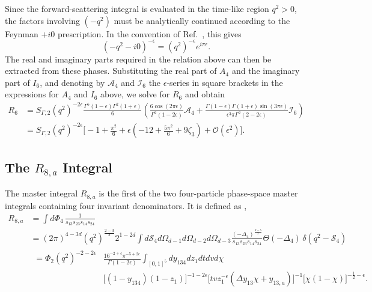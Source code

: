 Since the forward-scattering integral is evaluated in the time-like region $q^2>0$, the factors
involving $(-q^2)$ must be analytically continued according to the Feynman $+i0$ prescription.
In the convention of Ref.~\cite{GehrmannDeRidder0311276}, this gives
\begin{equation*}
    \left(-q^2-i0\right)^{-\epsilon}=\left(q^2\right)^{-\epsilon}e^{i\pi\epsilon}.
\end{equation*}
The real and imaginary parts required in the relation above can then be extracted from these
phases. Substituting the real part of $A_4$ and the imaginary part of $I_6$, and denoting by
$\mathcal A_4$ and $\mathcal I_6$ the $\epsilon$-series in square brackets in the expressions
for $A_4$ and $I_6$ above, we solve for $R_6$ and obtain
\begin{equation}
    \begin{split}
        R_6 &= S_{\Gamma,2}\!\left(q^2\right)^{-2\epsilon}\frac{\Gamma^6(1-\epsilon)\Gamma^2(1+\epsilon)}{6}\left(\frac{6\cos(2\pi\epsilon)}{\Gamma^2(1-2\epsilon)}\mathcal A_4+\frac{\Gamma(1-\epsilon)\Gamma(1+\epsilon)\sin(3\pi\epsilon)}{\epsilon^3\pi\Gamma^2(2-2\epsilon)}\mathcal I_6\right)\\
            &= S_{\Gamma,2}\!\left(q^2\right)^{-2\epsilon}\Bigg[-1+\frac{\pi^2}6+\epsilon\!\left(-12+\frac{5\pi^2}6+9\zeta_3\right)+\mathcal O\!\left(\epsilon^2\right)\Bigg].
    \end{split}
\end{equation}

\subsection{The $R_{8,a}$ Integral}\label{subsec:R8aMI}

The master integral $R_{8,a}$ is the first of the two four-particle phase-space master integrals
containing four invariant denominators. It is defined as \cite{GehrmannDeRidder0311276},
\begin{equation}
    \begin{split}
        R_{8,a} &= \int d\Phi_4\,\frac1{s_{13}s_{23}s_{14}s_{24}}\\
                &= (2\pi)^{4-3d}\!\left(q^2\right)^{\frac{2-d}{2}}2^{1-2d}\int d\mathcal S_4d\Omega_{d-1}d\Omega_{d-2}d\Omega_{d-3}\frac{(-\Delta_4)^{\frac{d-5}{2}}}{s_{13}s_{23}s_{14}s_{24}}\Theta(-\Delta_4)\,\delta\!\left(q^2-\mathcal S_4\right)\\
                &   \begin{split}
                        = \Phi_2\!\left(q^2\right)^{-2-2\epsilon}&\frac{16^{-2+\epsilon}\pi^{-5+2\epsilon}}{\Gamma(1-2\epsilon)}\int_{[0,1]^5} dy_{134}dz_1dtdvd\chi\\
                                                              &\Big[(1-y_{134})(1-z_1)\Big]^{-1-2\epsilon}\Big[tvz_1^{-\epsilon}(\Delta y_{13}\chi+y_{13,a})\Big]^{-1}\Big[\chi(1-\chi)\Big]^{-\frac12-\epsilon}.
                    \end{split}
    \end{split}
\end{equation}

